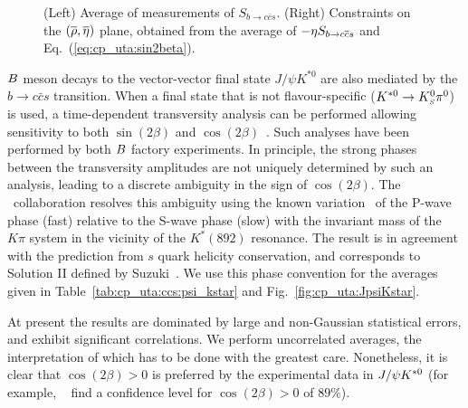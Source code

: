 \begin{figure}[htbp]
\begin{center}
{    }
  \end{center}
  \vspace{-0.5cm}
  \caption{
    (Left) Average of measurements of $S_{b \to c\bar c s}$.
    (Right) Constraints on the $(\overline{\rho},\overline{\eta})$ plane,
    obtained from the average of $-\etacp S_{b \to c\bar c s}$ 
    and Eq.~(\ref{eq:cp_uta:sin2beta}).
  }
  \label{fig:cp_uta:ccs}
\end{figure}

\label{sec:cp_uta:ccs:vv}

$B$ meson decays to the vector-vector final state $J/\psi K^{*0}$
are also mediated by the $b \to c \bar c s$ transition.
When a final state that is not flavour-specific ($K^{*0} \to K^0_{\scriptscriptstyle S} \pi^0$) is used,
a time-dependent transversity analysis can be performed 
allowing sensitivity to both 
$\sin(2\beta)$ and $\cos(2\beta)$~\cite{Dunietz:1990cj}.
Such analyses have been performed by both $B$ factory experiments.
In principle, the strong phases between the transversity amplitudes
are not uniquely determined by such an analysis, 
leading to a discrete ambiguity in the sign of $\cos(2\beta)$.
The \babar\ collaboration resolves 
this ambiguity using the known variation~\cite{Aston:1987ir}
of the P-wave phase (fast) relative to the S-wave phase (slow) 
with the invariant mass of the $K\pi$ system 
in the vicinity of the $K^*(892)$ resonance. 
The result is in agreement with the prediction from 
$s$ quark helicity conservation,
and corresponds to Solution II defined by Suzuki~\cite{Suzuki:2001za}.
We use this phase convention for the averages given in 
Table~\ref{tab:cp_uta:ccs:psi_kstar} and Fig.~\ref{fig:cp_uta:JpsiKstar}.



At present the results are dominated by 
large and non-Gaussian statistical errors,
and exhibit significant correlations.
We perform uncorrelated averages, 
the interpretation of which has to be done with the greatest care. 
Nonetheless, it is clear that $\cos(2\beta)>0$ is preferred 
by the experimental data in $J/\psi K^{*0}$ 
(for example, \babar~\cite{Aubert:2004cp} 
find a confidence level for $\cos(2\beta)>0$ of $89\%$).

